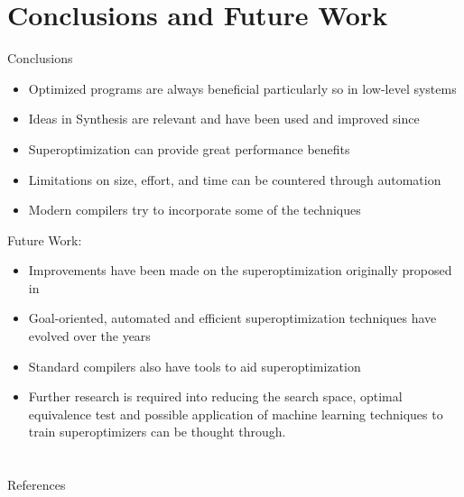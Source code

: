 \documentclass[10pt,aspectratio=\ratio,
compress
]{beamer}
\newcommand\meta{./meta}
\begin{document}
\section{Conclusions and Future Work}
\begin{frame}{Conclusions}
    \begin{itemize}
        \item Optimized programs are always beneficial particularly so in low-level systems
        \item Ideas in Synthesis are relevant and have been used and improved since
        \item Superoptimization can provide great performance benefits
        \item Limitations on size, effort, and time can be countered through automation
        \item Modern compilers try to incorporate some of the techniques
    \end{itemize}
    Future Work:
    \begin{itemize}
        \item Improvements have been made on the superoptimization originally proposed in \cite{superopt}
        \item Goal-oriented, automated and efficient superoptimization techniques have evolved over the years
        \item Standard compilers also have tools to aid superoptimization
        \item Further research is required into reducing the search space, optimal equivalence test and possible application of machine learning techniques to train superoptimizers can be thought through.
    \end{itemize}
\end{frame}


\section*{}
\begin{frame}[allowframebreaks]{References}
 \def\newblock{\hskip .11em plus .33em minus .07em}
 \scriptsize
 
 
 \normalsize
\end{frame}

\end{document}
